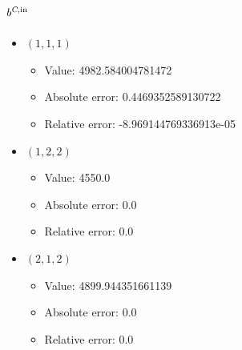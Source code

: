 \documentclass{article}%
\begin{document}
\subsection{$b^{\textsl{C},\text{in}}$}%
\begin{itemize}%
	\item $(1, 1, 1)$%
	\begin{itemize}%
		\item Value: 4982.584004781472%
		\item Absolute error: 0.4469352589130722%
		\item Relative error: -8.969144769336913e-05%
	\end{itemize}%
	\item $(1, 2, 2)$%
	\begin{itemize}%
		\item Value: 4550.0%
		\item Absolute error: 0.0%
		\item Relative error: 0.0%
	\end{itemize}%
	\item $(2, 1, 2)$%
	\begin{itemize}%
		\item Value: 4899.944351661139%
		\item Absolute error: 0.0%
		\item Relative error: 0.0%
	\end{itemize}%
\end{itemize}%
\end{document}
